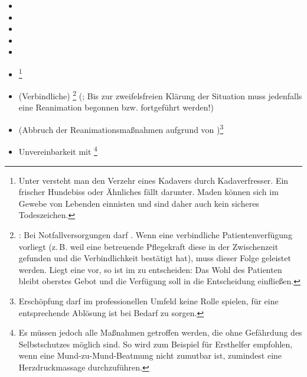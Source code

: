 \label{m:reanimation-unterlassung}
\begin{itemize}
  \item {}
  \item {}
  \item {}
  \item {}
  \item {}
  \item {}\footnote{Unter
   versteht man den Verzehr eines Kadavers
  durch Kadaverfresser. Ein frischer Hundebiss oder
  Ähnliches fällt  darunter. Maden können
  sich im Gewebe von Lebenden einnisten und sind daher
  auch kein sicheres Todeszeichen.}
  \item (Verbindliche) \footnote{: Bei Notfallversorgungen darf .
   Wenn  eine verbindliche
  Patientenverfügung vorliegt (z.\,B. weil eine betreuende
  Pflegekraft diese in der Zwischenzeit gefunden und die
  Verbindlichkeit bestätigt hat), muss dieser Folge
  geleistet werden.
Liegt eine  vor, so ist im
 zu entscheiden: Das Wohl des Patienten bleibt
oberstes Gebot und die Verfügung soll in die
Entscheidung einfließen.} (; 
  Bis zur zweifelsfreien Klärung der Situation muss
  jedenfalls eine Reanimation begonnen bzw. fortgeführt
  werden!)
  \item (Abbruch der Reanimationsmaßnahmen aufgrund
  von )\footnote{Erschöpfung darf im
  professionellen Umfeld keine Rolle spielen, für eine
  entsprechende Ablösung ist bei Bedarf zu sorgen.}
  \item Unvereinbarkeit mit
  \footnote{Es müssen jedoch alle Maßnahmen
  getroffen werden, die ohne Gefährdung des Selbstschutzes
  möglich sind. So wird zum Beispiel für Ersthelfer
  empfohlen, wenn
  eine Mund-zu-Mund-Beatmung nicht zumutbar ist, zumindest 
  eine Herzdruckmassage durchzuführen.}
\end{itemize}
